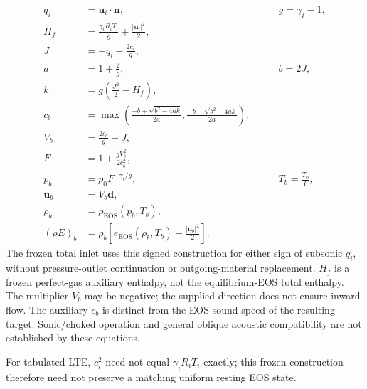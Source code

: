 \begin{align}
q_i &= \boldsymbol{u}_i\cdot\boldsymbol{n}, &\qquad g= \gamma_i-1,\\
H_f &= \frac{\gamma_i R_i T_i}{g}+\frac{|\boldsymbol{u}_i|^2}{2},\\
J &= -q_i-\frac{2c_i}{g},\\
a &= 1+\frac{2}{g}, &\qquad b= 2J,\\
k &= g\left(\frac{J^2}{2}-H_f\right),\\
c_b &= \max\left(\frac{-b+\sqrt{b^2-4ak}}{2a},
                  \frac{-b-\sqrt{b^2-4ak}}{2a}\right),\\
V_b &= \frac{2c_b}{g}+J,\\
F &= 1+\frac{gV_b^2}{2c_b^2},\\
p_b &= p_0 F^{-\gamma_i/g}, &\qquad T_b= \frac{T_0}{F},\\
\boldsymbol{u}_b &= V_b\boldsymbol{d},\\
\rho_b &= \rho_{\mathrm{EOS}}(p_b,T_b),\\
(\rho E)_b &= \rho_b\left[e_{\mathrm{EOS}}(\rho_b,T_b)
                         +\frac{|\boldsymbol{u}_b|^2}{2}\right].
\end{align}
The frozen total inlet uses this signed construction for either sign of subsonic
$q_i$, without pressure-outlet continuation or outgoing-material replacement.
$H_f$ is a frozen perfect-gas auxiliary enthalpy, not the equilibrium-EOS total
enthalpy. The multiplier $V_b$ may be negative; the supplied direction does not
ensure inward flow. The auxiliary $c_b$ is distinct from the EOS sound speed
of the resulting target. Sonic/choked operation and general oblique acoustic
compatibility are not established by these equations.

For tabulated LTE, $c_i^2$ need not equal $\gamma_i R_i T_i$ exactly; this frozen
construction therefore need not preserve a matching uniform resting EOS state.
